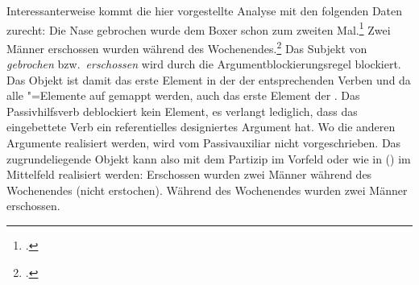 Interessanterweise kommt die hier vorgestellte Analyse mit den folgenden Daten zurecht:
\eal
\label{bsp-subjekt-im-vf-passiv}
\ex{}
Die Nase gebrochen wurde dem Boxer schon zum zweiten Mal.\footnote{
        .
}
\ex{}
Zwei Männer erschossen wurden    während des Wochenendes.\footnote{
        .%
        }
\label{bsp-subjekt-im-vf-passiv-letzt}
\zl
Das Subjekt von \emph{gebrochen} bzw.\ \emph{erschossen} %
wird durch die Argumentblockierungsregel blockiert. Das Objekt ist damit das erste
Element in der \argstl der entsprechenden Verben und da alle \argst"=Elemente auf \comps gemappt
werden, auch das erste Element der \compsl. Das Passivhilfsverb deblockiert kein
Element, es verlangt lediglich, dass das eingebettete Verb ein referentielles designiertes Argument
hat. Wo die anderen Argumente realisiert werden, wird vom Passivauxiliar nicht vorgeschrieben.
Das zugrundeliegende Objekt kann also mit dem Partizip im Vorfeld oder wie in ()
im Mittelfeld realisiert werden:
\eal
\ex Erschossen wurden zwei Männer während des Wochenendes (nicht erstochen).
\ex Während des Wochenendes wurden zwei Männer erschossen.
\zl

